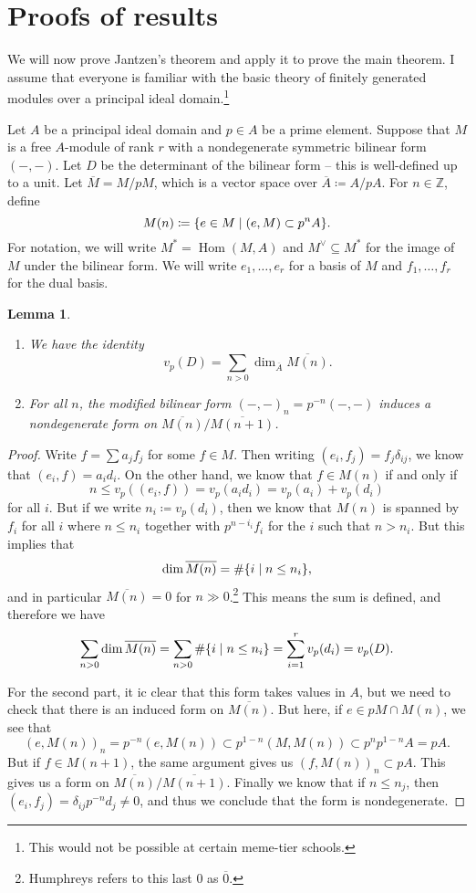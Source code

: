 \documentclass{amsart}
\newtheorem{lem}[thm]{Lemma}
\theoremstyle{definition}
\theoremstyle{remark}
\theoremstyle{plain}
\theoremstyle{definition}
\theoremstyle{remark}
\newcommand{\Z}{\mathbb{Z}}
\newcommand{\ol}[1]{\overline{#1}}
\newcommand{\1}{\mathbf{1}}
\newcommand{\2}{\mathbf{2}}
\newcommand{\3}{\mathbf{3}}
\DeclareMathOperator{\Hom}{Hom}
\begin{document}
\section{Proofs of results}
\label{sec:proofs_of_results}

We will now prove Jantzen's theorem and apply it to prove the main theorem. I assume that everyone is familiar with the basic theory of finitely generated modules over a principal ideal domain.\footnote{This would not be possible at certain meme-tier schools.}

Let $A$ be a principal ideal domain and $p \in A$ be a prime element. Suppose that $M$ is a free $A$-module of rank $r$ with a nondegenerate symmetric bilinear form $(-,-)$. Let $D$ be the determinant of the bilinear form -- this is well-defined up to a unit. Let $\ol{M} = M/pM$, which is a vector space over $\ol{A} \coloneqq A/pA$. For $n \in \Z$, define
\[ M(n) \coloneqq \qty{e \in M \mid (e, M) \subset p^n A}. \]
For notation, we will write $M^* = \Hom(M, A)$ and $M^{\vee} \subseteq M^*$ for the image of $M$ under the bilinear form. We will write $e_1, \ldots, e_r$ for a basis of $M$ and $f_1, \ldots, f_r$ for the dual basis.
\begin{lem}\leavevmode
  \begin{enumerate}
    \item We have the identity
          \[ v_p(D) = \sum_{n > 0} \dim_{\ol{A}} \ol{M(n)}. \]
    \item For all $n$, the modified bilinear form $(-,-)_n = p^{-n}(-,-)$ induces a nondegenerate form on $\ol{M(n)} / \ol{M(n+1)}$.
  \end{enumerate}
\end{lem}

\begin{proof}
  Write $f = \sum a_j f_j$ for some $f \in M$. Then writing $(e_i, f_j) = f_j \delta_{ij}$, we know that $(e_i, f) = a_i d_i$. On the other hand, we know that $f \in M(n)$ if and only if
  \[ n \leq v_p((e_i, f)) = v_p(a_i d_i) = v_p(a_i) + v_p(d_i) \]
  for all $i$. But if we write $n_i \coloneqq v_p(d_i)$, then we know that $M(n)$ is spanned by $f_i$ for all $i$ where $n \leq n_i$ together with $p^{n-i_i} f_i$ for the $i$ such that $n > n_i$. But this implies that
  \[ \dim \ol{M(n)} = \# \qty{i \mid n \leq n_i}, \]
  and in particular $\ol{M(n)} = 0$ for $n \gg 0$.\footnote{Humphreys refers to this last $0$ as $\ol{0}$.} This means the sum is defined, and therefore we have
  \[ \sum_{n>0} \dim \ol{M(n)} = \sum_{n > 0} \# \qty{i \mid n \leq n_i} = \sum_{i=1}^r v_p(d_i) = v_p(D). \]

  For the second part, it ic clear that this form takes values in $A$, but we need to check that there is an induced form on $\ol{M(n)}$. But here, if $e \in pM \cap M(n)$, we see that
  \[ (e, M(n))_n = p^{-n}(e, M(n)) \subset p^{1-n} (M, M(n)) \subset p^n p^{1-n} A = pA. \]
  But if $f \in M(n+1)$, the same argument gives us $(f, M(n))_n \subset pA$. This gives us a form on $\ol{M(n)} / \ol{M(n+1)}$. Finally we know that if $n \leq n_j$, then $(e_i, f_j) = \delta_{ij} p^{-n} d_j \neq 0$, and thus we conclude that the form is nondegenerate.
\end{proof}
\end{document}
